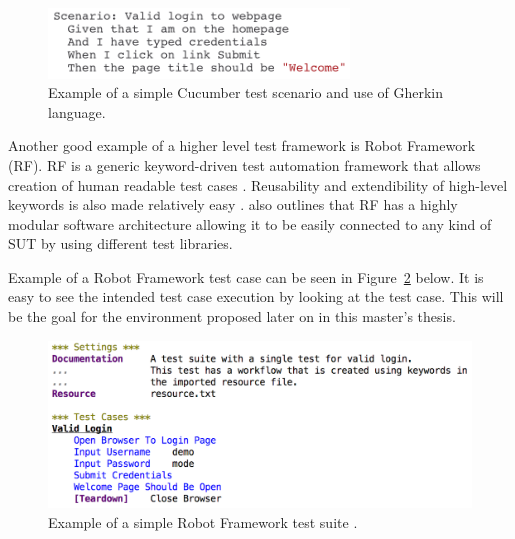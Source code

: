 \begin{figure}[ht]
  \begin{center}
    \includegraphics[width=8cm]{images/cucumber_example.png}
    \caption{Example of a simple Cucumber test scenario and use of Gherkin language.}
    \label{fig:cucumber}
  \end{center}
\end{figure}
\FloatBarrier

Another good example of a higher level test framework is Robot Framework (RF). RF is a generic keyword-driven test automation framework that allows creation of human readable test cases \citep{robotframework}. Reusability and extendibility of high-level keywords is also made relatively easy \citep{stresnjak2011usage}. \cite{Rfuserguide} also outlines that RF has a highly modular software architecture allowing it to be easily connected to any kind of SUT by using different test libraries.

Example of a Robot Framework test case can be seen in Figure~\ref{fig:robot_example} below. It is easy to see the intended test case execution by looking at the test case. This will be the goal for the environment proposed later on in this master's thesis.

\begin{figure}[ht]
  \begin{center}
    \includegraphics[width=11.5cm]{images/robot_example.png}
    \caption{Example of a simple Robot Framework test suite \citep{robotframework}.}
    \label{fig:robot_example}
  \end{center}
\end{figure}
\FloatBarrier
